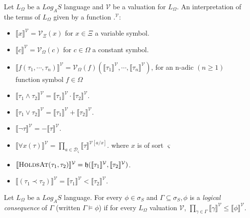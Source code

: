 \begin{defn}
  Let $L_{\Omega}$ be a $Log_AS$ language and $\mathcal{V}$ be a valuation for $L_{\Omega}$. An interpretation of the terms of $L_{\Omega}$ given by a function
  \textlbrackdbl .\textrbrackdbl$^{\mathcal{V}}$:
\end{defn}
\begin{itemize}
  \item $\llbracket x \rrbracket^{\mathcal{V}} = \mathcal{V}_{\Xi}(x)$ for $x \in \Xi$ a variable symbol.
  \item $\llbracket c \rrbracket^{\mathcal{V}} = \mathcal{V}_{\Omega}(c)$ for $c \in \Omega$ a constant symbol.
  \item $\llbracket f(\tau_1, \cdots, \tau_n) \rrbracket^{\mathcal{V}} = \mathcal{V}_{\Omega}(f)(\llbracket \tau_1 \rrbracket^{\mathcal{V}}, \cdots, \llbracket\tau_n \rrbracket^{\mathcal{V}})$,
        for an n-adic $(n \geq 1)$ function symbol $f \in \Omega$
  \item $\llbracket \tau_1 \land \tau_2 \rrbracket^{\mathcal{V}} = \llbracket \tau_1 \rrbracket^{\mathcal{V}} \cdot \llbracket \tau_2 \rrbracket^{\mathcal{V}}$.
  \item $\llbracket \tau_1 \lor \tau_2 \rrbracket^{\mathcal{V}} = \llbracket \tau_1 \rrbracket^{\mathcal{V}} + \llbracket \tau_2 \rrbracket^{\mathcal{V}}$.
  \item $\llbracket \neg \tau \rrbracket^{\mathcal{V}} = - \llbracket \tau \rrbracket^{\mathcal{V}}$.
  \item $\llbracket \forall x(\tau) \rrbracket^{\mathcal{V}} = \prod_{a \in \mathcal{D}_{\varsigma}} \llbracket \tau \rrbracket^{\mathcal{V}[a/x]}$. where $x$ is of sort $\varsigma$
  \item $\llbracket \textsc{HoldsAt}(\tau_1, \tau_2)\rrbracket^{\mathcal{V}} = \mathfrak{h}(\llbracket \tau_1 \rrbracket^{\mathcal{V}}, \llbracket \tau_2 \rrbracket^{\mathcal{V}})$.
  \item $\llbracket (\tau_1 \prec \tau_2) \rrbracket^{\mathcal{V}} = \llbracket \tau_1 \rrbracket^{\mathcal{V}} < \llbracket \tau_2 \rrbracket^{\mathcal{V}}$.
\end{itemize}

\begin{defn}
  Let $L_{\Omega}$ be a $Log_AS$ language.
  For every $\phi \in \sigma_S$ and $\Gamma \subseteq \sigma_S, \phi$ is a \textit{logical consequence} of $\Gamma$ (written $\Gamma \models \phi$) if for every $L_{\Omega}$ valuation $\mathcal{V}$,
  $\displaystyle \prod_{\gamma \in \Gamma} \llbracket \gamma \rrbracket^{\mathcal{V}} \leq \llbracket \phi \rrbracket^{\mathcal{V}}$.

\end{defn}


